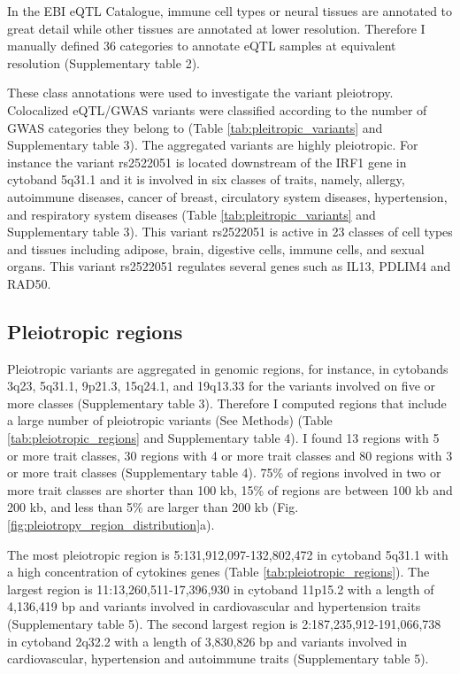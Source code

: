 In the EBI eQTL Catalogue, immune cell types or neural tissues are annotated to great detail while other tissues are annotated at lower resolution.
%
Therefore I manually defined 36 categories to annotate eQTL samples at equivalent resolution (Supplementary table 2).

These class annotations were used to investigate the variant pleiotropy.
%
Colocalized eQTL/GWAS variants were classified according to the number of GWAS categories they belong to (Table \ref{tab:pleitropic_variants} and Supplementary table 3).
%
The aggregated variants are highly pleiotropic.
%
For instance the variant rs2522051 is located downstream of the IRF1 gene in cytoband 5q31.1 and it is involved in six classes of traits, namely,
allergy, autoimmune diseases, cancer of breast, circulatory system diseases, hypertension, and respiratory system diseases
(Table \ref{tab:pleitropic_variants} and Supplementary table 3).
%
This variant rs2522051 is active in 23 classes of cell types and tissues including adipose, brain, digestive cells, immune cells, and sexual organs.
%
This variant rs2522051 regulates several genes such as IL13, PDLIM4 and RAD50.

\subsection*{Pleiotropic regions}

Pleiotropic variants are aggregated in genomic regions, for instance, in cytobands 3q23, 5q31.1, 9p21.3, 15q24.1, and 19q13.33 for the variants involved on five or more classes (Supplementary table 3).
%
Therefore I computed regions that include a large number of pleiotropic variants (See Methods) (Table \ref{tab:pleiotropic_regions} and Supplementary table 4).
%
I found 13 regions with 5 or more trait classes, 30 regions with 4 or more trait classes and 80 regions with 3 or more trait classes (Supplementary table 4).
%
75\% of regions involved in two or more trait classes are shorter than 100 kb, 15\% of regions are between 100 kb and 200 kb, and less than 5\% are larger than 200 kb (Fig. \ref{fig:pleiotropy_region_distribution}a).

The most pleiotropic region is 5:131,912,097-132,802,472 in cytoband 5q31.1 with a high concentration of cytokines genes (Table \ref{tab:pleiotropic_regions}).
%
The largest region is 11:13,260,511-17,396,930 in cytoband 11p15.2 with a length of 4,136,419 bp and variants involved in cardiovascular and hypertension traits (Supplementary table 5).
%
The second largest region is 2:187,235,912-191,066,738 in cytoband 2q32.2 with a length of 3,830,826 bp and variants involved in cardiovascular, hypertension and autoimmune traits  (Supplementary table 5).

